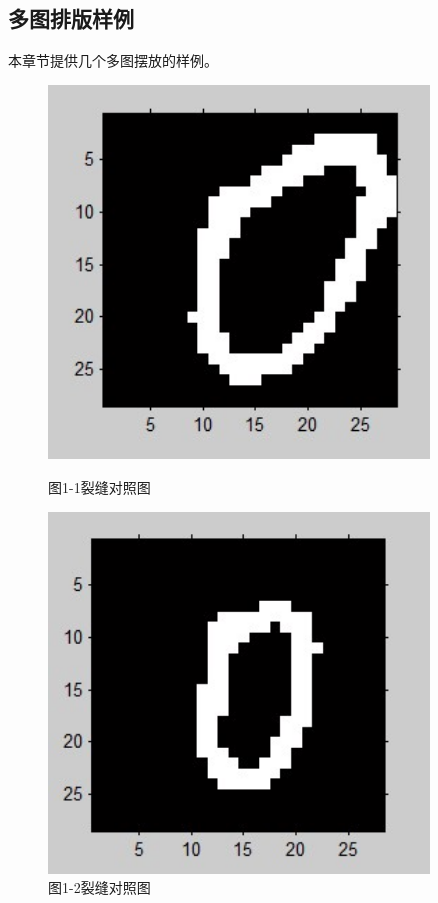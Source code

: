 ﻿\documentclass{scutthesis} %
\begin{document}
\subsection{多图排版样例}
本章节提供几个多图摆放的样例。
\begin{figure}[htbp]
\begin{minipage}[t]{0.48\linewidth}
\centering
\includegraphics[width=0.9\textwidth]{image/chap04/1.jpg}
\caption{图1-1裂缝对照图}
\label{fig:side:a}
\end{minipage}%
\begin{minipage}[t]{0.48\linewidth}
\centering
\includegraphics[width=0.9\textwidth]{image/chap04/2.jpg}  %
\caption{图1-2裂缝对照图}
\label{fig:side:b}
\end{minipage}
\end{figure}
\end{document}
